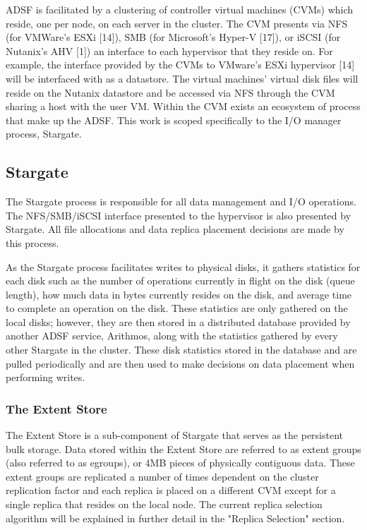\documentclass[12pt]{article}
\begin{document}
  ADSF is facilitated by a clustering of controller virtual machines (CVMs)
  which reside, one per node, on each server in the cluster. The CVM presents
  via NFS (for VMWare's ESXi [14]), SMB (for Microsoft's Hyper-V [17]), or
  iSCSI (for Nutanix's AHV [1]) an interface to each hypervisor that they
  reside on. For example, the interface provided by the CVMs to VMware's ESXi
  hypervisor [14] will be interfaced with as a datastore. The virtual machines'
  virtual disk files will reside on the Nutanix datastore and be accessed via
  NFS through the CVM sharing a host with the user VM. Within the CVM exists an
  ecosystem of process that make up the ADSF. This work is scoped specifically
  to the I/O manager process, Stargate.


  \subsection{Stargate}

  The Stargate process is responsible for all data management and I/O
  operations. The NFS/SMB/iSCSI interface presented to the hypervisor is also
  presented by Stargate. All file allocations and data replica placement
  decisions are made by this process.

  As the Stargate process facilitates writes to physical disks, it gathers
  statistics for each disk such as the number of operations currently in flight
  on the disk (queue length), how much data in bytes currently resides on the
  disk, and average time to complete an operation on the disk. These statistics
  are only gathered on the local disks; however, they are then stored in a
  distributed database provided by another ADSF service, Arithmos, along with
  the statistics gathered by every other Stargate in the cluster. These disk
  statistics stored in the database and are pulled periodically and are then
  used to make decisions on data placement when performing writes.

    \subsubsection{The Extent Store}

    The Extent Store is a sub-component of Stargate that serves as the
    persistent bulk storage. Data stored within the Extent Store are referred
    to as extent groups (also referred to as egroups), or 4MB pieces of
    physically contiguous data. These extent groups are replicated a number of
    times dependent on the cluster replication factor and each replica is
    placed on a different CVM except for a single replica that resides on the
    local node. The current replica selection algorithm will be explained in
    further detail in the "Replica Selection" section.
\end{document}
